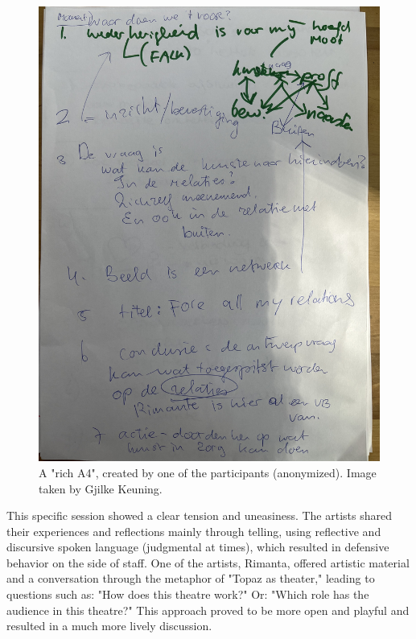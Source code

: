 \documentclass[authordate, empirical]{jote-new-article}
\begin{document}
	\begin{figure}
		\includegraphics[angle=270, width=\linewidth]{media/fig+1.jpeg}

		\caption{A "rich A4", created by one of the participants (anonymized). Image taken by Gjilke Keuning.}



	\end{figure}













	This specific session showed a clear tension and uneasiness. The artists shared their experiences and reflections mainly through telling, using reflective and discursive spoken language (judgmental at times), which resulted in defensive behavior on the side of staff. One of the artists, Rimanta, offered artistic material and a conversation through the metaphor of "Topaz as theater," leading to questions such as: "How does this theatre work?" Or: "Which role has the audience in this theatre?" This approach proved to be more open and playful and resulted in a much more lively discussion.
\end{document}
